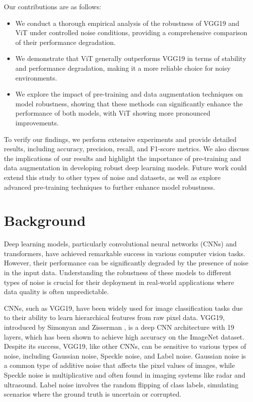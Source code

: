 \documentclass{article}
\begin{document}
Our contributions are as follows:
\begin{itemize}
    \item We conduct a thorough empirical analysis of the robustness of VGG19 and ViT under controlled noise conditions, providing a comprehensive comparison of their performance degradation.
    \item We demonstrate that ViT generally outperforms VGG19 in terms of stability and performance degradation, making it a more reliable choice for noisy environments.
    \item We explore the impact of pre-training and data augmentation techniques on model robustness, showing that these methods can significantly enhance the performance of both models, with ViT showing more pronounced improvements.
\end{itemize}

To verify our findings, we perform extensive experiments and provide detailed results, including accuracy, precision, recall, and F1-score metrics. We also discuss the implications of our results and highlight the importance of pre-training and data augmentation in developing robust deep learning models. Future work could extend this study to other types of noise and datasets, as well as explore advanced pre-training techniques to further enhance model robustness.

\section{Background}
Deep learning models, particularly convolutional neural networks (CNNs) and transformers, have achieved remarkable success in various computer vision tasks. However, their performance can be significantly degraded by the presence of noise in the input data. Understanding the robustness of these models to different types of noise is crucial for their deployment in real-world applications where data quality is often unpredictable.

CNNs, such as VGG19, have been widely used for image classification tasks due to their ability to learn hierarchical features from raw pixel data. VGG19, introduced by Simonyan and Zisserman \cite{simonyan2014very}, is a deep CNN architecture with 19 layers, which has been shown to achieve high accuracy on the ImageNet dataset. Despite its success, VGG19, like other CNNs, can be sensitive to various types of noise, including Gaussian noise, Speckle noise, and Label noise. Gaussian noise is a common type of additive noise that affects the pixel values of images, while Speckle noise is multiplicative and often found in imaging systems like radar and ultrasound. Label noise involves the random flipping of class labels, simulating scenarios where the ground truth is uncertain or corrupted.
\end{document}
